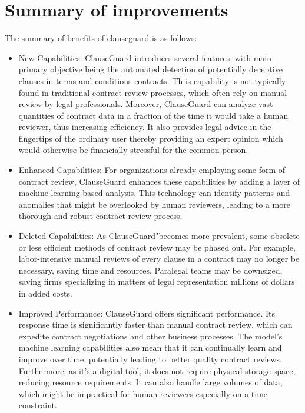 \section{Summary of improvements \label{Section::Summary of Imporvements }}
The summary of benefits of clauseguard is as follows: 
\begin{itemize}
    \item New Capabilities: ClauseGuard introduces several  features, with main primary objective being the automated detection of potentially deceptive clauses in terms and conditions contracts. Th is capability is not typically found in traditional contract review processes, which often rely on manual review by legal professionals. Moreover, ClauseGuard can analyze vast quantities of contract data in a fraction of the time it would take a human reviewer, thus increasing efficiency. It also provides legal advice in the fingertips of the ordinary user thereby providing an expert opinion which would otherwise be financially stressful for the common person. 

    \item Enhanced Capabilities: For organizations already employing some form of contract review, ClauseGuard enhances these capabilities by adding a layer of machine learning-based analysis. This technology can identify patterns and anomalies that might be overlooked by human reviewers, leading to a more thorough and robust contract review process. 
    \item Deleted Capabilities: As ClauseGuard"becomes more prevalent, some obsolete or less efficient methods of contract review may be phased out. For example, labor-intensive manual reviews of every clause in a contract may no longer be necessary, saving time and resources. Paralegal teams may be downsized, saving firms specializing in matters of legal representation millions of dollars in added costs. 
    \item Improved Performance: ClauseGuard offers significant performance. Its response time is significantly faster than manual contract review, which can expedite contract negotiations and other business processes. The model's machine learning capabilities also mean that it can continually learn and improve over time, potentially leading to better quality contract reviews. Furthermore, as it's a digital tool, it does not require physical storage space, reducing resource requirements. It can also handle large volumes of data, which might be impractical for human reviewers especially on a time constraint.




\end{itemize}


